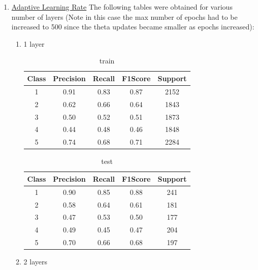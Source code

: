 \begin{enumerate}[label=(\alph*)]
    \item \underline{Adaptive Learning Rate} The following tables were obtained for various number of layers (Note in this case the max number of epochs had to be increased to 500 since the theta updates became smaller as epochs increased):
    \begin{enumerate}[label=\roman*.]
        \item 1 layer
        \begin{table}[!htb]
            \centering
            \begin{tabular}{ccccc}
            \hline
            Class & Precision & Recall & F1Score & Support \\ \hline
            1     & 0.91      & 0.83   & 0.87    & 2152    \\
            2     & 0.62      & 0.66   & 0.64    & 1843    \\
            3     & 0.50      & 0.52   & 0.51    & 1873    \\
            4     & 0.44      & 0.48   & 0.46    & 1848    \\
            5     & 0.74      & 0.68   & 0.71    & 2284    \\ \hline
            \end{tabular}
            \caption{train}
            \label{part d train depth 1}
        \end{table}
        \begin{table}[!htb]
            \centering
            \begin{tabular}{ccccc}
            \hline
            Class & Precision & Recall & F1Score & Support \\ \hline
            1     & 0.90      & 0.85   & 0.88    & 241     \\
            2     & 0.58      & 0.64   & 0.61    & 181     \\
            3     & 0.47      & 0.53   & 0.50    & 177     \\
            4     & 0.49      & 0.45   & 0.47    & 204     \\
            5     & 0.70      & 0.66   & 0.68    & 197     \\ \hline
            \end{tabular}
            \caption{test}
            \label{part d test depth 1}
        \end{table}
        \item 2 layers
        \begin{table}[!htb]
            \centering
            \begin{tabular}{ccccc}

\end{tabular}
\end{table}
\end{enumerate}
\end{enumerate}
